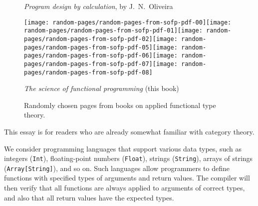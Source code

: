 \begin{figure}
\begin{centering}
\emph{Program design by calculation}, by J.~N.~Oliveira
\par\end{centering}
\begin{centering}
\vspace{1\baselineskip}
\par\end{centering}
\begin{centering}
\texttt{[image: random-pages/random-pages-from-sofp-pdf-00]}\texttt{[image: random-pages/random-pages-from-sofp-pdf-01]}\texttt{[image: random-pages/random-pages-from-sofp-pdf-02]}\texttt{[image: random-pages/random-pages-from-sofp-pdf-05]}\texttt{[image: random-pages/random-pages-from-sofp-pdf-06]}\texttt{[image: random-pages/random-pages-from-sofp-pdf-07]}\texttt{[image: random-pages/random-pages-from-sofp-pdf-08]}
\par\end{centering}
\vspace{-0.3\baselineskip}

\begin{centering}
\emph{The science of functional programming} (this book)
\par\end{centering}
\vspace{1\baselineskip}

\caption{Randomly chosen pages from books on applied functional type theory.\label{fig:Randomly-chosen-pages}}
\end{figure}



This essay is for
readers who are already somewhat familiar with category theory.


We consider programming languages that support various data types,
such as integers (\lstinline!Int!), floating-point numbers (\lstinline!Float!),
strings (\lstinline!String!), arrays of strings (\lstinline!Array[String]!),
and so on. Such languages allow programmers to define functions with
specified types of arguments and return values. The compiler will
then verify that all functions are always applied to arguments of
correct types, and also that all return values have the expected types. 

